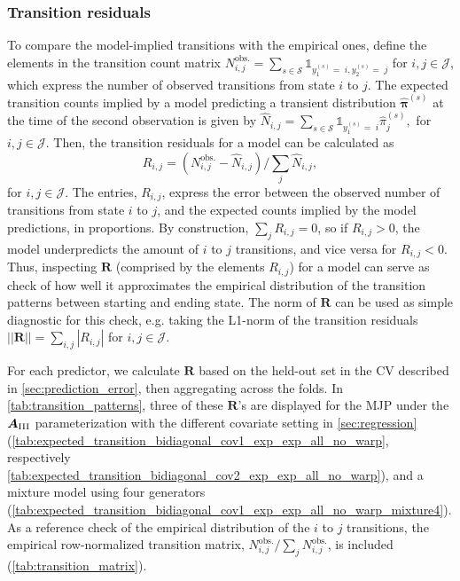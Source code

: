 \subsubsection{Transition residuals} \label{sec:transition_patterns}

To compare the model-implied transitions with the empirical ones, define the elements in the transition count matrix
$
  N_{i,j}^{\text{obs.}} = \sum_{s \in \mathcal S} \mathds{1}_{y_1^{(s)} =\; i, y_2^{(s)} =\; j}
$ for $i,j \in \mathcal J$, which express the number of observed transitions from state $i$ to $j$. The expected transition counts implied by a model predicting a transient distribution $\widehat{\bm \pi}^{(s)}$ at the time of the second observation is given by
$
\widehat{  N}_{i,j} =  \sum_{s \in \mathcal S} \mathds{1}_{y_1^{(s)} = \; i} \widehat{ \pi}_j^{(s)},
$ for $i,j \in \mathcal J$.
Then, the transition residuals for a model can be calculated as
$$
  R_{i,j} = \left(  N_{i,j}^{\text{obs.}} - \widehat{  N}_{i,j} \right) / \sum_{j}   \widehat{  N}_{i,j},
$$ for $i,j \in \mathcal J$.
The entries, $  R_{i,j}$, express the error between the observed number of transitions from state $i$ to $j$, and the expected counts implied by the model predictions, in proportions. 
By construction, $\sum_{j}   R_{i,j} = 0$, so if $  R_{i,j} > 0$, the model underpredicts the amount of $i$ to $j$ transitions, and vice versa for $  R_{i,j} < 0$.
Thus, inspecting $\bm R$ (comprised by the elements $R_{i,j}$) for a model can serve as check of how well it approximates the empirical distribution of the transition patterns between starting and ending state. The norm of $\bm R$ can be used as simple diagnostic for this check, e.g. taking the L1-norm of the transition residuals
$
|| \bm R || = \sum_{i,j} |  R_{i,j}|
$ for $i,j \in \mathcal J$.

For each predictor, we calculate $\bm R$ based on the held-out set in the CV described in \cref{sec:prediction_error}, then aggregating across the folds. In \cref{tab:transition_patterns}, three of these $\bm R$'s are displayed for the MJP under the $\bm{A}_{\RN{3}}$ parameterization with the different covariate setting in \cref{sec:regression} (\cref{tab:expected_transition_bidiagonal_cov1_exp_exp_all_no_warp}, respectively \cref{tab:expected_transition_bidiagonal_cov2_exp_exp_all_no_warp}), and a mixture model using four generators (\cref{tab:expected_transition_bidiagonal_cov1_exp_exp_all_no_warp_mixture4}). As a reference check of the empirical distribution of the $i$ to $j$ transitions, the empirical row-normalized transition matrix, $ N_{i,j}^{\text{obs.}} / \sum_{j}  N_{i,j}^{\text{obs.}}$, is included (\cref{tab:transition_matrix}).

